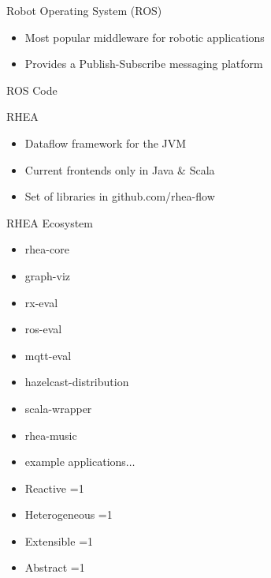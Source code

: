\documentclass{beamer}
\newcommand{\done}{\ding{51}}
\renewcommand\alert[1]{\textcolor{mLightBrown}{#1}}
\newcommand{\checklist}[4]{
  \begin{frame}[standout]
	  \begin{itemize}
    \item Reactive \ifnum #1=1 \done \fi
    \item Heterogeneous \ifnum #2=1 \done \fi
    \item Extensible \ifnum #3=1 \done \fi
    \item Abstract \ifnum #4=1 \done \fi
    \end{itemize}
  \end{frame}
}
\begin{document}
	\begin{frame}{Robot Operating System (ROS)}
    \begin{itemize}    	  
		\item Most popular middleware for robotic applications
	  \item Provides a Publish-Subscribe messaging platform \vspace{1cm}
	  \end{itemize} 
	\end{frame}
	
	\begin{frame}{ROS Code}
	\end{frame}
	
	\begin{frame}{RHEA}
	  \begin{itemize}
	  \item Dataflow framework for the JVM
	  \item Current frontends only in Java \& Scala
	  \item Set of libraries in \alert{github.com/rhea-flow}
	  \end{itemize}
	\end{frame}

	\begin{frame}{RHEA Ecosystem}
		\begin{multicols}{2}
			\begin{itemize} %
				\item \alert{rhea-core}
				\item graph-viz
				\item rx-eval
				\item ros-eval
				\item mqtt-eval
				
				\item hazelcast-distribution
				\item scala-wrapper
				\item rhea-music
				\item example applications$\dots$
			\end{itemize}
		\end{multicols}
	\end{frame}
	
	\checklist{0}{0}{0}{1}
	
\end{document}
